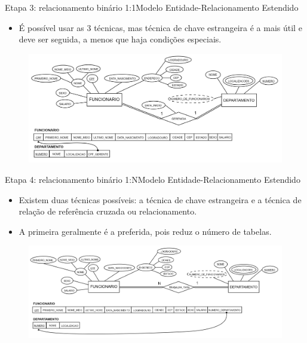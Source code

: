 \documentclass[t]{beamer}
\begin{document}

\begin{ftst}{Etapa 3: relacionamento binário 1:1}{Modelo Entidade-Relacionamento Estendido}
\begin{itemize}
    \item É possível usar as 3 técnicas, mas técnica de chave estrangeira é a mais útil e deve ser seguida, a menos que haja condições especiais.
\end{itemize}

\begin{figure}
    \centering
    \includegraphics[scale=0.12]{Figuras/03_05.png}
\end{figure}
\end{ftst}


\begin{ftst}{Etapa 4: relacionamento binário 1:N}{Modelo Entidade-Relacionamento Estendido}
\small
\begin{itemize}
    \item Existem duas técnicas possíveis: a técnica de chave estrangeira e a técnica de relação de referência cruzada ou relacionamento. 
    \item A primeira geralmente é a preferida, pois reduz o número de tabelas.
\end{itemize}
\begin{figure}
    \centering
    \includegraphics[scale=0.1]{Figuras/03_09.png}
\end{figure}
\end{ftst}
\end{document}
